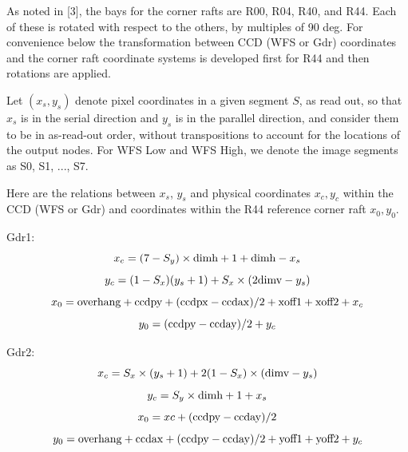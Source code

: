 \documentclass{article}[12pt]
\newcommand{\red}{\textcolor{red}}
\begin{document}
{%

As noted in [3], the bays for the corner rafts are R00, R04, R40, and R44.  Each of these is rotated with respect to the others, by multiples of 90 deg.  For convenience below the transformation between CCD (WFS or Gdr) coordinates and the corner raft coordinate systems is developed first for R44 and then rotations are applied.

Let $(x_s, y_s)$ denote pixel coordinates in a given segment $S$, as read out, so that $x_s$ is in the serial direction and $y_s$ is in the parallel direction, and consider them to be in as-read-out order, without transpositions to account for the locations of the output nodes.  For WFS Low and WFS High, we denote the image segments as S0, S1, ..., S7.  

Here are the relations between $x_s$, $y_s$ and physical coordinates $x_c, y_c$ within the CCD (WFS or Gdr) and coordinates within the R44 reference corner raft $x_0, y_0$.

Gdr1:
\begin{equation}
x_c = (7 - S_y) \times {\rm dimh} + 1 + {\rm dimh} - x_s
\end{equation}
\begin{equation}
y_c = (1 - S_x) ( y_s + 1) +  S_x \times ({2\rm dimv} - y_s)   %
\end{equation}
\begin{equation}
x_0 = {\rm overhang} + {\rm ccdpy} + ({\rm ccdpx} - {\rm ccdax})/2  + {\rm xoff1} + {\rm xoff2} + x_c
\end{equation}
\begin{equation}
y_0 = ({\rm ccdpy} - {\rm ccday})/2 + y_c
\end{equation}

Gdr2:
\begin{equation}
x_c =  S_x \times (y_s + 1) + 2(1 - S_x) \times ({\rm dimv} - y_s)
\end{equation}
\begin{equation}
y_c = S_y \times {\rm dimh} + 1  + x_s
\end{equation}
\begin{equation}
x_0 = xc + ({\rm ccdpy} - {\rm ccday})/2
\end{equation}
\begin{equation}
y_0 = {\rm overhang} + {\rm ccdax} + ({\rm ccdpy} - {\rm ccday})/2 + {\rm yoff1} + {\rm yoff2} + y_c
\end{equation}

}
\end{document}
